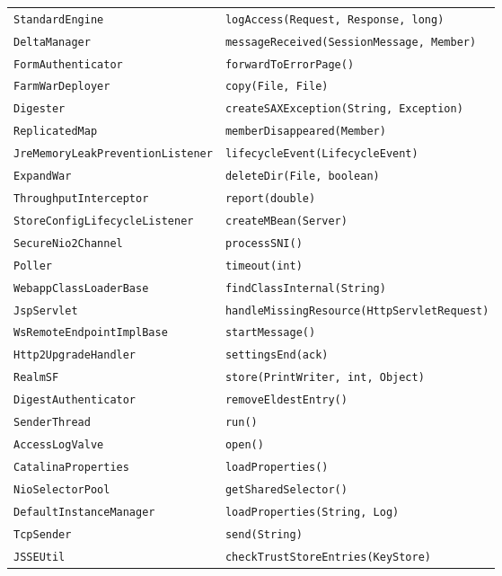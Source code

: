 \begin{center}
\begin{longtable}{ll}
 \lstinline/StandardEngine/&{\lstinline/logAccess(Request, Response, long)/}\\
 \lstinline/DeltaManager/&{\lstinline/messageReceived(SessionMessage, Member)/}\\
 \lstinline/FormAuthenticator/&{\lstinline/forwardToErrorPage()/}\\
 \lstinline/FarmWarDeployer/&{\lstinline/copy(File, File)/}\\
 \lstinline/Digester/&{\lstinline/createSAXException(String, Exception)/}\\
 \lstinline/ReplicatedMap/&{\lstinline/memberDisappeared(Member)/}\\
 \lstinline/JreMemoryLeakPreventionListener/&{\lstinline/lifecycleEvent(LifecycleEvent)/}\\
 \lstinline/ExpandWar/&{\lstinline/deleteDir(File, boolean)/}\\
 \lstinline/ThroughputInterceptor/&{\lstinline/report(double)/}\\
 \lstinline/StoreConfigLifecycleListener/&{\lstinline/createMBean(Server)/}\\
 \lstinline/SecureNio2Channel/&{\lstinline/processSNI()/}\\
 \lstinline/Poller/&{\lstinline/timeout(int)/}\\
 \lstinline/WebappClassLoaderBase/&{\lstinline/findClassInternal(String)/}\\
 \lstinline/JspServlet/&{\lstinline/handleMissingResource(HttpServletRequest)/}\\
 \lstinline/WsRemoteEndpointImplBase/&{\lstinline/startMessage()/}\\
 \lstinline/Http2UpgradeHandler/&{\lstinline/settingsEnd(ack)/}\\
 \lstinline/RealmSF/&{\lstinline/store(PrintWriter, int, Object)/}\\
 \lstinline/DigestAuthenticator/&{\lstinline/removeEldestEntry()/}\\
 \lstinline/SenderThread/&{\lstinline/run()/}\\
 \lstinline/AccessLogValve/&{\lstinline/open()/}\\
 \lstinline/CatalinaProperties/&{\lstinline/loadProperties()/}\\
 \lstinline/NioSelectorPool/&{\lstinline/getSharedSelector()/}\\
 \lstinline/DefaultInstanceManager/&{\lstinline/loadProperties(String, Log)/}\\
 \lstinline/TcpSender/&{\lstinline/send(String)/}\\
 \lstinline/JSSEUtil/&{\lstinline/checkTrustStoreEntries(KeyStore)/}\\

\end{longtable}
\end{center}
